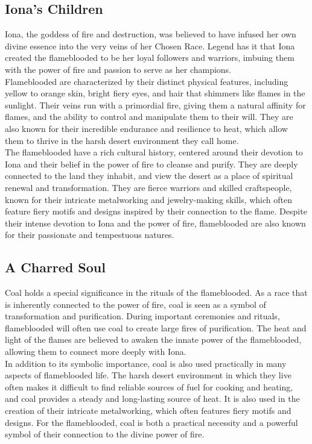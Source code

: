 \subsection{Iona's Children}
 Iona, the goddess of fire and destruction, was believed to have infused her own divine essence into the very veins of her Chosen Race. Legend has it that Iona created the flameblooded to be her loyal followers and warriors, imbuing them with the power of fire and passion to serve as her champions.\\
Flameblooded are characterized by their distinct physical features, including yellow to orange skin, bright fiery eyes, and hair that shimmers like flames in the sunlight. Their veins run with a primordial fire, giving them a natural affinity for flames, and the ability to control and manipulate them to their will. They are also known for their incredible endurance and resilience to heat, which allow them to thrive in the harsh desert environment they call home.\\
The flameblooded have a rich cultural history, centered around their devotion to Iona and their belief in the power of fire to cleanse and purify. They are deeply connected to the land they inhabit, and view the desert as a place of spiritual renewal and transformation. They are fierce warriors and skilled craftspeople, known for their intricate metalworking and jewelry-making skills, which often feature fiery motifs and designs inspired by their connection to the flame. Despite their intense devotion to Iona and the power of fire, flameblooded are also known for their passionate and tempestuous natures.
\subsection{A Charred Soul}
Coal holds a special significance in the rituals of the flameblooded. As a race that is inherently connected to the power of fire, coal is seen as a symbol of transformation and purification. During important ceremonies and rituals, flameblooded will often use coal to create large fires of purification. The heat and light of the flames are believed to awaken the innate power of the flameblooded, allowing them to connect more deeply with Iona.\\
In addition to its symbolic importance, coal is also used practically in many aspects of flameblooded life. The harsh desert environment in which they live often makes it difficult to find reliable sources of fuel for cooking and heating, and coal provides a steady and long-lasting source of heat. It is also used in the creation of their intricate metalworking, which often features fiery motifs and designs. For the flameblooded, coal is both a practical necessity and a powerful symbol of their connection to the divine power of fire.
